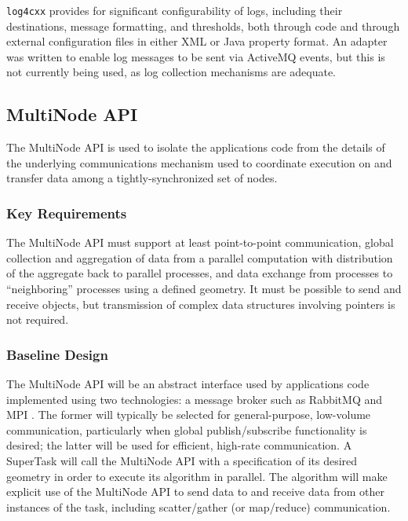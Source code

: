 \documentclass[DM,toc]{lsstdoc}
\begin{document}
\texttt{log4cxx} provides for significant configurability of logs, including
their destinations, message formatting, and thresholds, both through code and
through external configuration files in either XML or Java property format.
An adapter was written to enable log messages to be sent via ActiveMQ events,
but this is not currently being used, as log collection mechanisms are
adequate.


\subsection{MultiNode API}\label{multinode-api}

The MultiNode API is used to isolate the applications code from the details of
the underlying communications mechanism used to coordinate execution on and
transfer data among a tightly-synchronized set of nodes.

\subsubsection{Key Requirements}\label{multinode-reqs}

The MultiNode API must support at least point-to-point communication, global
collection and aggregation of data from a parallel computation with
distribution of the aggregate back to parallel processes, and data
exchange from processes to ``neighboring'' processes using a defined
geometry. It must be possible to send and receive objects, but
transmission of complex data structures involving pointers is not
required.

\subsubsection{Baseline Design}\label{multinode-design}

The MultiNode API will be an abstract interface used by applications code
implemented using two technologies: a message broker such as RabbitMQ
\citep{RabbitMQ} and MPI \citep{MPI}. The former will typically be selected for
general-purpose, low-volume communication, particularly when global
publish/subscribe functionality is desired; the latter will be used for
efficient, high-rate communication. A SuperTask will call the MultiNode API
with a specification of its desired geometry in order to execute its algorithm
in parallel. The algorithm will make explicit use of the MultiNode API to send
data to and receive data from other instances of the task, including
scatter/gather (or map/reduce) communication.
\end{document}
